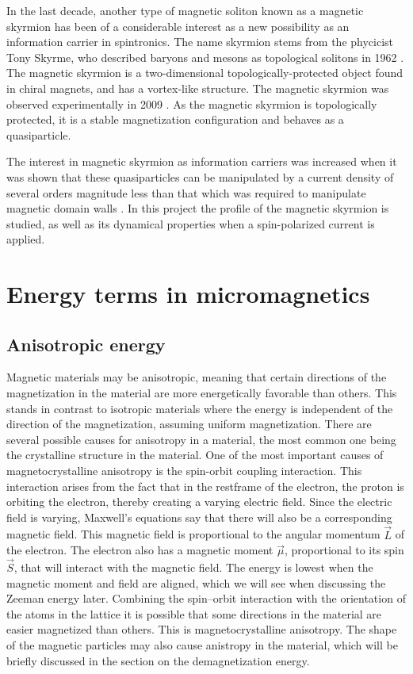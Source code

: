 \documentclass[12pt, a4paper]{article}		%
\numberwithin{equation}{section}
\begin{document}
In the last decade, another type of magnetic soliton known as a magnetic skyrmion has been of a considerable interest as a new possibility as an information carrier in spintronics. The name skyrmion stems from the phycicist Tony Skyrme, who described baryons and mesons as topological solitons in 1962 \cite{Skyrme1962}. The magnetic skyrmion is a two-dimensional topologically-protected object found in chiral magnets, and has a vortex-like structure. The magnetic skyrmion was observed experimentally in 2009 \cite{Muhlbauer2009}. As the magnetic skyrmion is topologically protected, it is a stable magnetization configuration and behaves as a quasiparticle. 

The interest in magnetic skyrmion as information carriers was increased when it was shown that these quasiparticles can be manipulated by a current density of several orders magnitude less than that which was required to manipulate magnetic domain walls \cite{Jonietz2010}. In this project the profile of the magnetic skyrmion is studied, as well as its dynamical properties when a spin-polarized current is applied.

\newpage

\section{Energy terms in micromagnetics}
\subsection{Anisotropic energy}
Magnetic materials may be anisotropic, meaning that certain directions of the magnetization in the material are more energetically favorable than others. This stands in contrast to isotropic materials where the energy is independent of the direction of the magnetization, assuming uniform magnetization. There are several possible causes for anisotropy in a material, the most common one being the crystalline structure in the material. One of the most important causes of magnetocrystalline anisotropy is the spin-orbit coupling interaction. This interaction arises from the fact that in the restframe of the electron, the proton is orbiting the electron, thereby creating a varying electric field. Since the electric field is varying, Maxwell's equations say that there will also be a corresponding magnetic field. This magnetic field is proportional to the angular momentum $\vec{L}$ of the electron. The electron also has a magnetic moment $\vec{\mu}$, proportional to its spin $\vec{S}$, that will interact with the magnetic field. The energy is lowest when the magnetic moment and field are aligned, which we will see when discussing the Zeeman energy later. Combining the spin--orbit interaction with the orientation of the atoms in the lattice it is possible that some directions in the material are easier magnetized than others. This is magnetocrystalline anisotropy. The shape of the magnetic particles may also cause anistropy in the material, which will be briefly discussed in the section on the demagnetization energy. 
\end{document}
